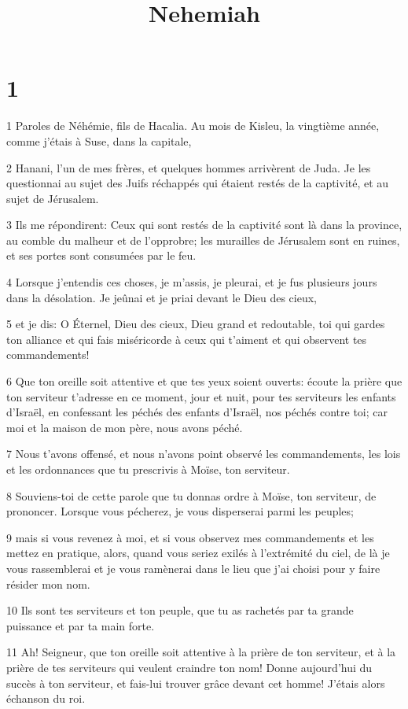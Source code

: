 

\title{Nehemiah}


\chapter{1}

\par 1 Paroles de Néhémie, fils de Hacalia. Au mois de Kisleu, la vingtième année, comme j'étais à Suse, dans la capitale,
\par 2 Hanani, l'un de mes frères, et quelques hommes arrivèrent de Juda. Je les questionnai au sujet des Juifs réchappés qui étaient restés de la captivité, et au sujet de Jérusalem.
\par 3 Ils me répondirent: Ceux qui sont restés de la captivité sont là dans la province, au comble du malheur et de l'opprobre; les murailles de Jérusalem sont en ruines, et ses portes sont consumées par le feu.
\par 4 Lorsque j'entendis ces choses, je m'assis, je pleurai, et je fus plusieurs jours dans la désolation. Je jeûnai et je priai devant le Dieu des cieux,
\par 5 et je dis: O Éternel, Dieu des cieux, Dieu grand et redoutable, toi qui gardes ton alliance et qui fais miséricorde à ceux qui t'aiment et qui observent tes commandements!
\par 6 Que ton oreille soit attentive et que tes yeux soient ouverts: écoute la prière que ton serviteur t'adresse en ce moment, jour et nuit, pour tes serviteurs les enfants d'Israël, en confessant les péchés des enfants d'Israël, nos péchés contre toi; car moi et la maison de mon père, nous avons péché.
\par 7 Nous t'avons offensé, et nous n'avons point observé les commandements, les lois et les ordonnances que tu prescrivis à Moïse, ton serviteur.
\par 8 Souviens-toi de cette parole que tu donnas ordre à Moïse, ton serviteur, de prononcer. Lorsque vous pécherez, je vous disperserai parmi les peuples;
\par 9 mais si vous revenez à moi, et si vous observez mes commandements et les mettez en pratique, alors, quand vous seriez exilés à l'extrémité du ciel, de là je vous rassemblerai et je vous ramènerai dans le lieu que j'ai choisi pour y faire résider mon nom.
\par 10 Ils sont tes serviteurs et ton peuple, que tu as rachetés par ta grande puissance et par ta main forte.
\par 11 Ah! Seigneur, que ton oreille soit attentive à la prière de ton serviteur, et à la prière de tes serviteurs qui veulent craindre ton nom! Donne aujourd'hui du succès à ton serviteur, et fais-lui trouver grâce devant cet homme! J'étais alors échanson du roi.

